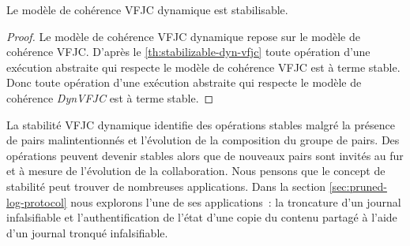 \begin{theorem}\label{th:stabilizable-dyn-vfjc}
Le modèle de cohérence \acl{VFJC} dynamique est stabilisable.
\end{theorem}

\begin{proof}
Le modèle de cohérence \acl{VFJC} dynamique repose sur le modèle de cohérence \acl{VFJC}.
D'après le \autoref{th:stabilizable-dyn-vfjc} toute opération d'une exécution abstraite qui respecte le modèle de cohérence \acl{VFJC} est à terme stable.
Donc toute opération d'une exécution abstraite qui respecte le modèle de cohérence \emph{DynVFJC} est à terme stable.
\end{proof}

La stabilité \acl{VFJC} dynamique identifie des opérations stables malgré la présence de pairs malintentionnés et l'évolution de la composition du groupe de pairs.
Des opérations peuvent devenir stables alors que de nouveaux pairs sont invités au fur et à mesure de l'évolution de la collaboration.
Nous pensons que le concept de stabilité peut trouver de nombreuses applications.
Dans la section \autoref{sec:pruned-log-protocol} nous explorons l'une de ses applications~: la troncature d'un journal infalsifiable et l'authentification de l'état d'une copie du contenu partagé à l'aide d'un journal tronqué infalsifiable.

%
%
%
%
%
%



